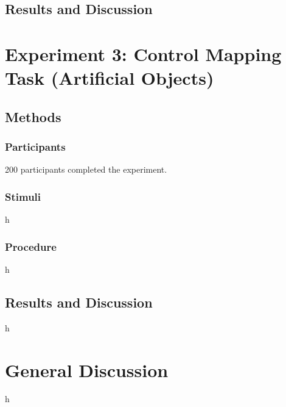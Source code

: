 \documentclass[man]{apa2}
\begin{document}
\subsection{Results and Discussion}

				
\section{Experiment 3: Control Mapping Task (Artificial Objects)}

\subsection{Methods}
\subsubsection{Participants} 200 participants completed the experiment.
\subsubsection{Stimuli} h

\subsubsection{Procedure}
h

\subsection{Results and Discussion}
h

\section{General Discussion}

h







\newpage
\theappendix 

\section{}
\end{document}
